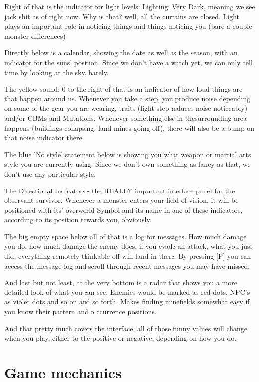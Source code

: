 \documentclass[11pt]{report}
\begin{document}
Right of that is the indicator for light levels: Lighting: Very Dark, meaning we see jack shit as of right now. Why is that? well, all the curtains are closed. Light plays an important role in noticing things and things noticing you (bare a couple monster differences)

Directly below is a calendar, showing the date as well as the season, with an indicator for the suns' position. Since we don't have a watch yet, we can only tell time by looking at the sky, barely.

The yellow sound: 0 to the right of that is an indicator of how loud things are that happen around us. Whenever you take a step, you produce noise depending on some of the gear you are wearing, traits (light step reduces noise noticeably) and/or CBMs and Mutations. Whenever something else in thesurrounding area happens (buildings collapsing, land mines going off), there will also be a bump on that noise indicator there.

The blue 'No style' statement below is showing you what weapon or martial arts style you are currently using. Since we don't own something as fancy as that, we don't use any particular style.

The Directional Indicators - the REALLY important interface panel for the observant survivor. Whenever a monster enters your field of vision, it will be positioned with its' overworld Symbol and its name in one of these indicators, according to its position towards you, obviously.

The big empty space below all of that is a log for messages. How much damage you do, how much damage the enemy does, if you evade an attack, what you just did, everything remotely thinkable off will land in there. By pressing [P] you can access the message log and scroll through recent messages you may have missed.

And last but not least, at the very bottom is a radar that shows you a more detailed look of what you can see. Enemies would be marked as red dots, NPC's as violet dots and so on and so forth. Makes finding minefields somewhat easy if you know their pattern and o
ccurrence positions.

And that pretty much covers the interface, all of those funny values will change when you play, either to the positive or negative, depending on how you do.

\section{Game mechanics}
\end{document}
